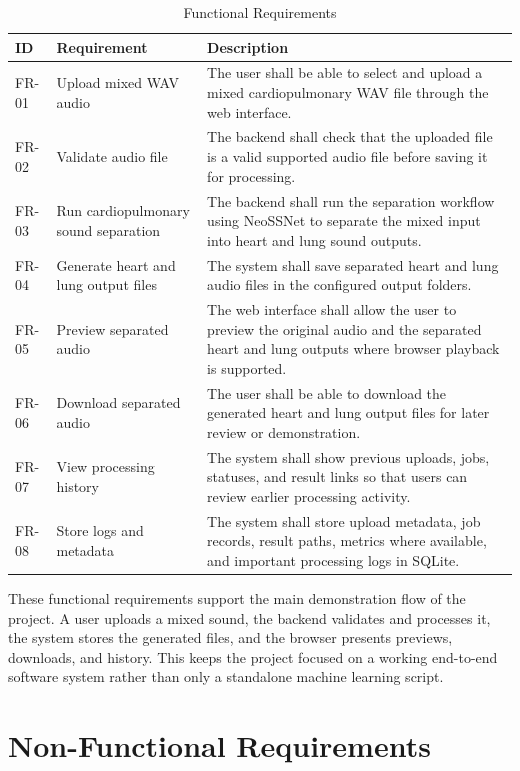 \begin{table}[H]
  \centering
  \small
  \caption{Functional Requirements}
  \label{tab:functional-requirements}
  \begin{tabularx}{\textwidth}{p{} p{} Y}
    \toprule
    \textbf{ID} & \textbf{Requirement} & \textbf{Description} \\
    \midrule
    FR-01 & Upload mixed WAV audio & The user shall be able to select and upload a mixed cardiopulmonary WAV file through the web interface. \\
    FR-02 & Validate audio file & The backend shall check that the uploaded file is a valid supported audio file before saving it for processing. \\
    FR-03 & Run cardiopulmonary sound separation & The backend shall run the separation workflow using NeoSSNet to separate the mixed input into heart and lung sound outputs. \\
    FR-04 & Generate heart and lung output files & The system shall save separated heart and lung audio files in the configured output folders. \\
    FR-05 & Preview separated audio & The web interface shall allow the user to preview the original audio and the separated heart and lung outputs where browser playback is supported. \\
    FR-06 & Download separated audio & The user shall be able to download the generated heart and lung output files for later review or demonstration. \\
    FR-07 & View processing history & The system shall show previous uploads, jobs, statuses, and result links so that users can review earlier processing activity. \\
    FR-08 & Store logs and metadata & The system shall store upload metadata, job records, result paths, metrics where available, and important processing logs in SQLite. \\
    \bottomrule
  \end{tabularx}
\end{table}

These functional requirements support the main demonstration flow of the project. A user uploads a mixed sound, the backend validates and processes it, the system stores the generated files, and the browser presents previews, downloads, and history. This keeps the project focused on a working end-to-end software system rather than only a standalone machine learning script.

\section{Non-Functional Requirements}

